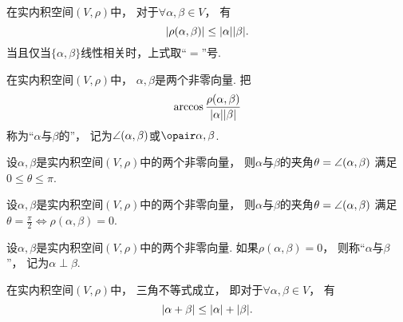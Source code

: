 \begin{theorem}
在实内积空间\((V,\rho)\)中，
对于\(\forall \alpha,\beta \in V\)，
有\begin{equation}
	\abs{\rho(\alpha,\beta)} \leq \abs{\alpha} \abs{\beta}.
\end{equation}
当且仅当\(\{\alpha,\beta\}\)线性相关时，上式取“\(=\)”号.
\end{theorem}

\begin{definition}
在实内积空间\((V,\rho)\)中，
\(\alpha,\beta\)是两个非零向量.
把\begin{equation}
	\arccos\frac{\rho(\alpha,\beta)}{\abs{\alpha} \abs{\beta}}
\end{equation}
称为“\(\alpha\)与\(\beta\)的”，
记为\(\angle(\alpha,\beta)\)或\(\VectorAngleP{\alpha}{\beta}\).
\end{definition}

\begin{property}
设\(\alpha,\beta\)是实内积空间\((V,\rho)\)中的两个非零向量，
则\(\alpha\)与\(\beta\)的夹角\(\theta = \angle(\alpha,\beta)\)
满足\(0 \leq \theta \leq \pi\).
\end{property}

\begin{property}
设\(\alpha,\beta\)是实内积空间\((V,\rho)\)中的两个非零向量，
则\(\alpha\)与\(\beta\)的夹角\(\theta = \angle(\alpha,\beta)\)
满足\(\theta = \frac\pi2 \iff \rho(\alpha,\beta) = 0\).
\end{property}

\begin{definition}
设\(\alpha,\beta\)是实内积空间\((V,\rho)\)中的两个非零向量.
如果\(\rho(\alpha,\beta) = 0\)，
则称“\(\alpha\)与\(\beta\) ”，
记为\(\alpha \perp \beta\).
\end{definition}

\begin{corollary}
在实内积空间\((V,\rho)\)中，
三角不等式成立，
即对于\(\forall \alpha,\beta \in V\)，
有\begin{equation}
	\abs{\alpha+\beta} \leq \abs{\alpha} + \abs{\beta}.
\end{equation}
\end{corollary}

